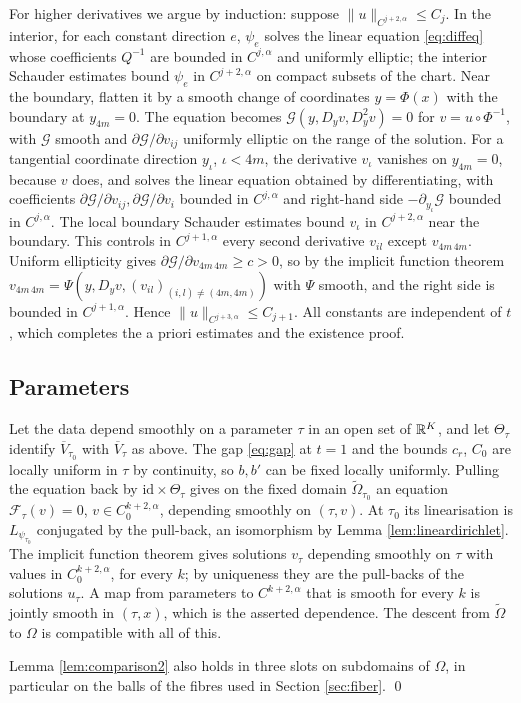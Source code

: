 For higher derivatives we argue by induction: suppose $\|u\|_{C^{j+2,\alpha}}\le C_j$. In the interior,
for each constant direction $e$, $\psi_e$ solves the linear equation \eqref{eq:diffeq} whose
coefficients $Q^{-1}$ are bounded in $C^{j,\alpha}$ and uniformly elliptic; the interior Schauder
estimates bound $\psi_e$ in $C^{j+2,\alpha}$ on compact subsets of the chart. Near the boundary, flatten
it by a smooth change of coordinates $y=\Phi(x)$ with the boundary at $y_{4m}=0$. The equation becomes
$\mathcal G(y,D_yv,D_y^2v)=0$ for $v=u\circ\Phi^{-1}$, with $\mathcal G$ smooth and
$\partial\mathcal G/\partial v_{ij}$ uniformly elliptic on the range of the solution. For a tangential
coordinate direction $y_\iota$, $\iota<4m$, the derivative $v_\iota$ vanishes on $y_{4m}=0$, because
$v$ does, and solves the linear equation obtained by differentiating, with coefficients
$\partial\mathcal G/\partial v_{ij},\partial\mathcal G/\partial v_i$ bounded in $C^{j,\alpha}$ and right-hand side
$-\partial_{y_\iota}\mathcal G$ bounded in $C^{j,\alpha}$. The local boundary Schauder estimates bound
$v_\iota$ in $C^{j+2,\alpha}$ near the boundary. This controls in $C^{j+1,\alpha}$ every second derivative
$v_{il}$ except $v_{4m\,4m}$. Uniform ellipticity gives $\partial\mathcal G/\partial v_{4m\,4m}\ge c>0$, so
by the implicit function theorem $v_{4m\,4m}=\Psi(y,D_yv,(v_{il})_{(i,l)\ne(4m,4m)})$ with $\Psi$
smooth, and the right side is bounded in $C^{j+1,\alpha}$. Hence $\|u\|_{C^{j+3,\alpha}}\le C_{j+1}$. All
constants are independent of $t$, which completes the a priori estimates and the existence proof.

\subsection{Parameters}
Let the data depend smoothly on a parameter $\tau$ in an open set of $\mathbb{R}^K$, and let
$\Theta_\tau$ identify $\overline V_{\tau_0}$ with $\overline V_\tau$ as above. The gap \eqref{eq:gap} at
$t=1$ and the bounds $c_r$, $C_0$ are locally uniform in $\tau$ by continuity, so $b,b'$ can be fixed
locally uniformly. Pulling the equation back by $\mathrm{id}\times\Theta_\tau$ gives on the fixed domain
$\tilde\Omega_{\tau_0}$ an equation $\mathcal F_\tau(v)=0$, $v\in C^{k+2,\alpha}_0$, depending smoothly on
$(\tau,v)$. At $\tau_0$ its linearisation is $L_{\psi_{\tau_0}}$ conjugated by the pull-back, an
isomorphism by Lemma \ref{lem:lineardirichlet}. The implicit function theorem gives solutions
$v_\tau$ depending smoothly on $\tau$ with values in $C^{k+2,\alpha}_0$, for every $k$; by uniqueness they
are the pull-backs of the solutions $u_\tau$. A map from parameters to $C^{k+2,\alpha}$ that is smooth for
every $k$ is jointly smooth in $(\tau,x)$, which is the asserted dependence. The descent from
$\tilde\Omega$ to $\Omega$ is compatible with all of this.

Lemma \ref{lem:comparison2} also holds in three slots on subdomains of $\Omega$, in particular on the
balls of the fibres used in Section \ref{sec:fiber}. \qed
